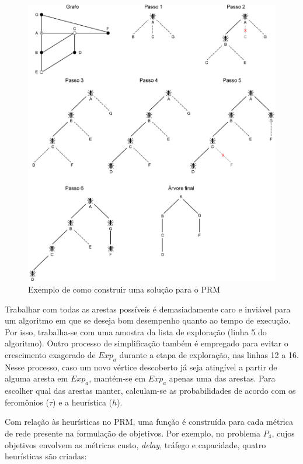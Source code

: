 \begin{figure}[!htbp]	
	\includegraphics[width=1\textwidth]{cap_algoritmo-proposto/figs/exemplo-solucao}
	\caption{\label{fig_exemplo_solucao}Exemplo de como construir uma solução para o PRM}
\end{figure}

Trabalhar com todas as arestas possíveis é demasiadamente caro e inviável para um algoritmo em que se deseja bom desempenho quanto ao tempo de execução. Por isso, trabalha-se com uma amostra da lista de exploração (linha 5 do algoritmo). Outro processo de simplificação também é empregado para evitar o crescimento exagerado de $Exp_a$ durante a etapa de exploração, nas linhas 12 a 16. Nesse processo, caso um novo vértice descoberto já seja atingível a partir de alguma aresta em $Exp_a$, mantém-se em $Exp_a$ apenas uma das arestas. Para escolher qual das arestas manter, calculam-se as probabilidades de acordo com os feromônios ($\tau$) e a heurística ($h$).

Com relação às heurísticas no PRM, uma função é construída para cada métrica de rede presente na formulação de objetivos. Por exemplo, no problema $P_4$, cujos objetivos envolvem as métricas custo, \textit{delay}, tráfego e capacidade, quatro heurísticas são criadas:

